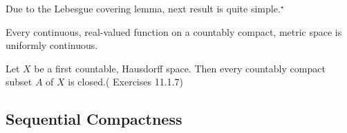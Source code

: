 Due to the Lebesgue covering lemma, next result is quite simple.$^\star$

\begin{theorem}
	Every continuous, real-valued function on a countably compact, metric space is uniformly continuous.
\end{theorem}

\begin{proposition}
	Let $X$ be a first countable, Hausdorff space. Then every countably compact subset $A$ of $X$ is closed.(\cite{joshi} Exercises 11.1.7)
\end{proposition}


\subsection{Sequential Compactness}
